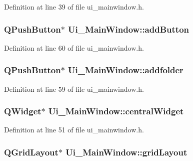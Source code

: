 Definition at line 39 of file ui\_\-mainwindow.h.

\hypertarget{classUi__MainWindow_a1761410af45480e8a833dae3c88e96e4}{
\subsubsection[{addButton}]{\setlength{\rightskip}{0pt plus 5cm}QPushButton$\ast$ {\bf Ui\_\-MainWindow::addButton}}}
\label{classUi__MainWindow_a1761410af45480e8a833dae3c88e96e4}


Definition at line 60 of file ui\_\-mainwindow.h.

\hypertarget{classUi__MainWindow_ac80c9560810ddceb7494fa1f77079559}{
\subsubsection[{addfolder}]{\setlength{\rightskip}{0pt plus 5cm}QPushButton$\ast$ {\bf Ui\_\-MainWindow::addfolder}}}
\label{classUi__MainWindow_ac80c9560810ddceb7494fa1f77079559}


Definition at line 59 of file ui\_\-mainwindow.h.

\hypertarget{classUi__MainWindow_a30075506c2116c3ed4ff25e07ae75f81}{
\subsubsection[{centralWidget}]{\setlength{\rightskip}{0pt plus 5cm}QWidget$\ast$ {\bf Ui\_\-MainWindow::centralWidget}}}
\label{classUi__MainWindow_a30075506c2116c3ed4ff25e07ae75f81}


Definition at line 51 of file ui\_\-mainwindow.h.

\hypertarget{classUi__MainWindow_a525ed3c5fe0784ac502ee222fba4e205}{
\subsubsection[{gridLayout}]{\setlength{\rightskip}{0pt plus 5cm}QGridLayout$\ast$ {\bf Ui\_\-MainWindow::gridLayout}}}
\label{classUi__MainWindow_a525ed3c5fe0784ac502ee222fba4e205}



